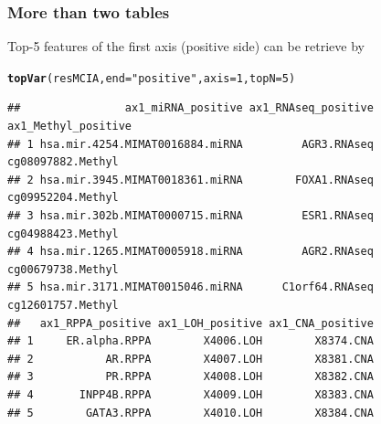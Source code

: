 \documentclass[10pt,xcolor=dvipsnames]{beamer}\usepackage[]{graphicx}\usepackage[]{color}
\makeatletter
\newcommand{\hlnum}[1]{\textcolor[rgb]{0.686,0.059,0.569}{#1}}%
\newcommand{\hlstr}[1]{\textcolor[rgb]{0.192,0.494,0.8}{#1}}%
\newcommand{\hlstd}[1]{\textcolor[rgb]{0.345,0.345,0.345}{#1}}%
\newcommand{\hlkwc}[1]{\textcolor[rgb]{0.333,0.667,0.333}{#1}}%
\newcommand{\hlkwd}[1]{\textcolor[rgb]{0.737,0.353,0.396}{\textbf{#1}}}%
\newenvironment{kframe}{%
 \def\at@end@of@kframe{}%
 \ifinner\ifhmode%
  \def\at@end@of@kframe{\end{minipage}}%
  \begin{minipage}{\columnwidth}%
 \fi\fi%
 \def\FrameCommand##1{\hskip\@totalleftmargin \hskip-\fboxsep
 \colorbox{shadecolor}{##1}\hskip-\fboxsep
     \hskip-\linewidth \hskip-\@totalleftmargin \hskip\columnwidth}%
 \MakeFramed {\advance\hsize-\width
   \@totalleftmargin\z@ \linewidth\hsize
   \@setminipage}}%
 {\par\unskip\endMakeFramed%
 \at@end@of@kframe}
\newenvironment{knitrout}{}{} %
\makeatother
\begin{document}
\begin{frame}[fragile]\frametitle{More than two tables}

Top-5 features of the first axis (positive side) can be retrieve by

\scriptsize 
\begin{knitrout}\footnotesize
{}\color{fgcolor}\begin{kframe}
\begin{alltt}
\hlkwd{topVar}\hlstd{(resMCIA,} \hlkwc{end}\hlstd{=}\hlstr{"positive"}\hlstd{,} \hlkwc{axis}\hlstd{=}\hlnum{1}\hlstd{,} \hlkwc{topN}\hlstd{=}\hlnum{5}\hlstd{)}
\end{alltt}
\begin{verbatim}
##                ax1_miRNA_positive ax1_RNAseq_positive ax1_Methyl_positive
## 1 hsa.mir.4254.MIMAT0016884.miRNA         AGR3.RNAseq   cg08097882.Methyl
## 2 hsa.mir.3945.MIMAT0018361.miRNA        FOXA1.RNAseq   cg09952204.Methyl
## 3 hsa.mir.302b.MIMAT0000715.miRNA         ESR1.RNAseq   cg04988423.Methyl
## 4 hsa.mir.1265.MIMAT0005918.miRNA         AGR2.RNAseq   cg00679738.Methyl
## 5 hsa.mir.3171.MIMAT0015046.miRNA      C1orf64.RNAseq   cg12601757.Methyl
##   ax1_RPPA_positive ax1_LOH_positive ax1_CNA_positive
## 1     ER.alpha.RPPA        X4006.LOH        X8374.CNA
## 2           AR.RPPA        X4007.LOH        X8381.CNA
## 3           PR.RPPA        X4008.LOH        X8382.CNA
## 4       INPP4B.RPPA        X4009.LOH        X8383.CNA
## 5        GATA3.RPPA        X4010.LOH        X8384.CNA
\end{verbatim}
\end{kframe}
\end{knitrout}

\end{frame}
\end{document}
